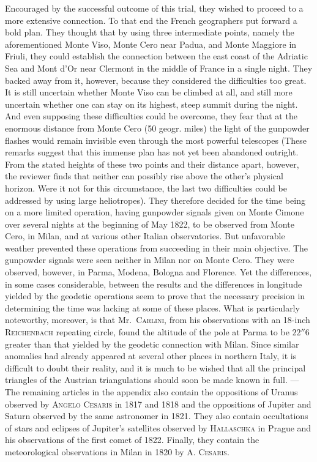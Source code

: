 Encouraged by the successful outcome of this trial, they wished to proceed to a
 more extensive connection.
To that end the French geographers put forward a bold plan. They thought that by using three intermediate points, namely the aforementioned Monte Viso, Monte Cero near Padua, and Monte Maggiore in Friuli, they could establish the connection between the east coast of the Adriatic Sea and Mont d'Or near Clermont in the middle of France in a single night.
They backed away from it, however, because they considered the difficulties too great.
It is still uncertain whether Monte Viso can be climbed at all, and still more uncertain whether one can stay on its highest, steep summit during the night.
And even supposing these difficulties could be overcome, they fear that at the enormous distance from Monte Cero (50 geogr. miles) the light of the gunpowder flashes would remain invisible even through the most powerful telescopes
(These remarks suggest that this immense plan has not yet been abandoned outright. From the stated heights of these two points and their distance apart, however, the reviewer finds that neither can possibly rise above the other's physical horizon. Were it not for this circumstance, the last two difficulties could be addressed by using large heliotropes).
They therefore decided for the time being on a more limited operation, having gunpowder signals given on Monte Cimone over several nights at the beginning of May 1822, to be observed from Monte Cero, in Milan, and at various other Italian observatories.
But unfavorable weather prevented these operations from succeeding in their main objective. The gunpowder signals were seen neither in Milan nor on Monte Cero.
They were observed, however, in Parma, Modena, Bologna and Florence. Yet the differences, in some cases considerable, between the results and the differences in longitude yielded by the geodetic operations seem to prove that the necessary precision in determining the time was lacking at some of these places.
What is particularly noteworthy, moreover, is that Mr.~\textsc{Carlini}, from his observations with an 18-inch \textsc{Reichenbach} repeating circle, found the altitude of the pole at Parma to be $22''6$ greater than that yielded by the geodetic connection with Milan.
Since similar anomalies had already appeared at several other places in northern Italy, it is difficult to doubt their reality, and it is much to be wished that all the principal triangles of the Austrian triangulations should soon be made known in full. --- The remaining articles in the appendix also contain the oppositions of Uranus observed by \textsc{Angelo Cesaris} in 1817 and 1818 and the oppositions of Jupiter and Saturn observed by the same astronomer in 1821. They also contain occultations of stars and eclipses of Jupiter's satellites observed by \textsc{Hallaschka} in Prague and his observations of the first comet of 1822. Finally, they contain the meteorological observations in Milan in 1820 by A. \textsc{Cesaris}.
\par\clearpage\endgroup
